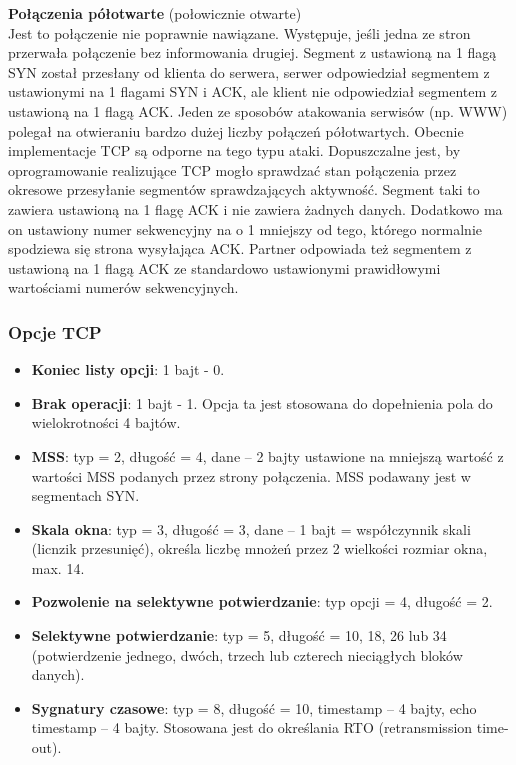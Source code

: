 \documentclass[a4paper]{article}
\begin{document}
\textbf{Połączenia półotwarte} (połowicznie otwarte)\\
Jest to połączenie nie poprawnie nawiązane. Występuje, jeśli jedna ze stron przerwała połączenie bez informowania drugiej. Segment z ustawioną na 1 flagą SYN został przesłany od
klienta do serwera, serwer odpowiedział segmentem z ustawionymi na 1 flagami SYN i ACK,
ale klient nie odpowiedział segmentem z ustawioną na 1 flagą ACK.
Jeden ze sposobów atakowania serwisów (np. WWW) polegał na otwieraniu bardzo dużej
liczby połączeń półotwartych. Obecnie implementacje TCP są odporne na tego typu ataki.
Dopuszczalne jest, by oprogramowanie realizujące TCP mogło sprawdzać stan połączenia
przez okresowe przesyłanie segmentów sprawdzających aktywność. Segment taki to zawiera
ustawioną na 1 flagę ACK i nie zawiera żadnych danych. Dodatkowo ma on ustawiony numer
sekwencyjny na o 1 mniejszy od tego, którego normalnie spodziewa się strona wysyłająca
ACK. Partner odpowiada też segmentem z ustawioną na 1 flagą ACK ze standardowo
ustawionymi prawidłowymi wartościami numerów sekwencyjnych.


\subsubsection{Opcje TCP}
\begin{itemize}
    \item \textbf{Koniec listy opcji}: 1 bajt - 0.
    \item \textbf{Brak operacji}: 1 bajt - 1. Opcja ta jest stosowana do dopełnienia pola do wielokrotności 4 bajtów.
    \item \textbf{MSS}: typ = 2, długość = 4, dane – 2 bajty ustawione na mniejszą wartość z wartości MSS podanych przez strony połączenia. MSS podawany jest w segmentach SYN.
    \item \textbf{Skala okna}: typ = 3, długość = 3, dane – 1 bajt = współczynnik skali (licnzik przesunięć), określa liczbę mnożeń przez 2 wielkości rozmiar okna, max. 14.
    \item \textbf{Pozwolenie na selektywne potwierdzanie}: typ opcji = 4, długość = 2.
    \item \textbf{Selektywne potwierdzanie}: typ = 5, długość = 10, 18, 26 lub 34 (potwierdzenie jednego, dwóch, trzech lub czterech nieciągłych bloków danych).
    \item \textbf{Sygnatury czasowe}: typ = 8, długość = 10, timestamp – 4 bajty, echo timestamp – 4 bajty.
    Stosowana jest do określania RTO (retransmission time-out).

\end{itemize}
\end{document}

